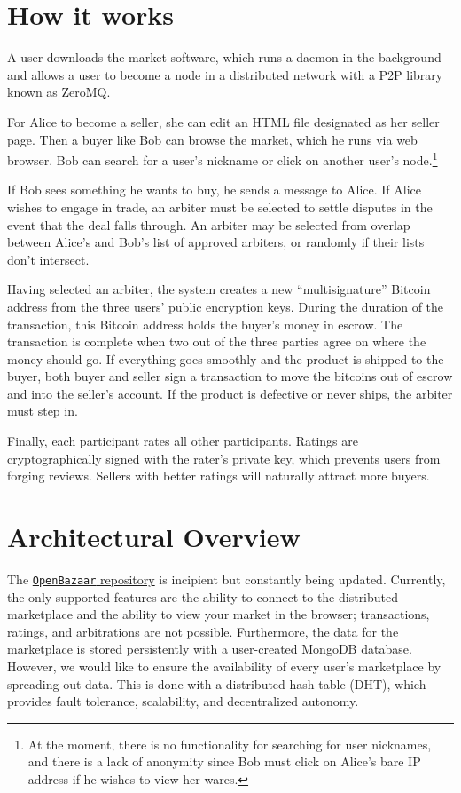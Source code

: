 \documentclass[12pt,twocolumn]{article}
\begin{document}
\section{How it works}
A user downloads the market software, which runs a daemon in the background and allows a user to become a node in a distributed network with a P2P library known as ZeroMQ. 

For Alice to become a seller, she can edit an HTML file designated as her seller page.
Then a buyer like Bob can browse the market, which he runs via web browser.
Bob can search for a user's nickname or click on another user's node.\footnote{At the moment, there is no functionality for searching for user nicknames, and there is a lack of anonymity since Bob must click on Alice's bare IP address if he wishes to view her wares.}

If Bob sees something he wants to buy, he sends a message to Alice.
If Alice wishes to engage in trade, an arbiter must be selected to settle disputes in the event that the deal falls through.
An arbiter may be selected from overlap between Alice's and Bob's list of approved arbiters, or randomly if their lists don't intersect.

Having selected an arbiter, the system creates a new ``multisignature'' Bitcoin address from the three users' public encryption keys.
During the duration of the transaction, this Bitcoin address holds the buyer's money in escrow.
The transaction is complete when two out of the three parties agree on where the money should go.
If everything goes smoothly and the product is shipped to the buyer, both buyer and seller sign a transaction to move the bitcoins out of escrow and into the seller's account.
If the product is defective or never ships, the arbiter must step in.

Finally, each participant rates all other participants.
Ratings are cryptographically signed with the rater's private key, which prevents users from forging reviews.
Sellers with better ratings will naturally attract more buyers. 

\section{Architectural Overview}
The \href{https://github.com/OpenBazaar/OpenBazaar}{{\tt OpenBazaar} repository} is incipient but constantly being updated.
Currently, the only supported features are the ability to connect to the distributed marketplace and the ability to view your market in the browser; transactions, ratings, and arbitrations are not possible.
Furthermore, the data for the marketplace is stored persistently with a user-created MongoDB database.
However, we would like to ensure the availability of every user's marketplace by spreading out data.
This is done with a distributed hash table (DHT), which provides fault tolerance, scalability, and decentralized autonomy.
\end{document}
